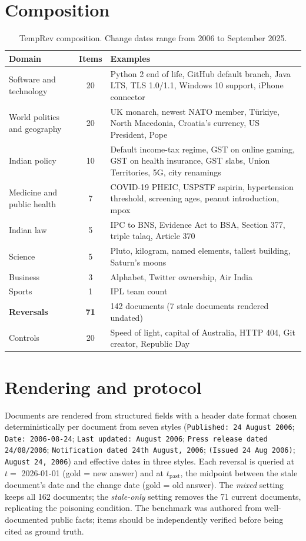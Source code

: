 \documentclass[11pt,a4paper]{report}
\begin{document}
\section{Composition}
\begin{table}[htbp]\centering\caption{TempRev composition. Change dates range from 2006 to September 2025.}\small
\begin{tabularx}{\linewidth}{l c X}\toprule\rowcolor{cIngest}\textbf{Domain}&\textbf{Items}&\textbf{Examples}\\\midrule
Software and technology & 20 & Python 2 end of life, GitHub default branch, Java LTS, TLS 1.0/1.1, Windows 10 support, iPhone connector\\
World politics and geography & 20 & UK monarch, newest NATO member, T\"urkiye, North Macedonia, Croatia's currency, US President, Pope\\
Indian policy & 10 & Default income-tax regime, GST on online gaming, GST on health insurance, GST slabs, Union Territories, 5G, city renamings\\
Medicine and public health & 7 & COVID-19 PHEIC, USPSTF aspirin, hypertension threshold, screening ages, peanut introduction, mpox\\
Indian law & 5 & IPC to BNS, Evidence Act to BSA, Section 377, triple talaq, Article 370\\
Science & 5 & Pluto, kilogram, named elements, tallest building, Saturn's moons\\
Business & 3 & Alphabet, Twitter ownership, Air India\\
Sports & 1 & IPL team count\\\midrule
\textbf{Reversals} & \textbf{71} & 142 documents (7 stale documents rendered undated)\\
Controls & 20 & Speed of light, capital of Australia, HTTP 404, Git creator, Republic Day\\\bottomrule\end{tabularx}\end{table}

\section{Rendering and protocol}
Documents are rendered from structured fields with a header date format chosen deterministically per document from seven styles (\texttt{Published: 24 August 2006}; \texttt{Date: 2006-08-24}; \texttt{Last updated: August 2006}; \texttt{Press release dated 24/08/2006}; \texttt{Notification dated 24th August, 2006}; \texttt{(Issued 24 Aug 2006)}; \texttt{August 24, 2006}) and effective dates in three styles. Each reversal is queried at $t=$ 2026-01-01 (gold = new answer) and at $t_{\text{past}}$, the midpoint between the stale document's date and the change date (gold = old answer). The \emph{mixed} setting keeps all 162 documents; the \emph{stale-only} setting removes the 71 current documents, replicating the poisoning condition. The benchmark was authored from well-documented public facts; items should be independently verified before being cited as ground truth.
\end{document}
